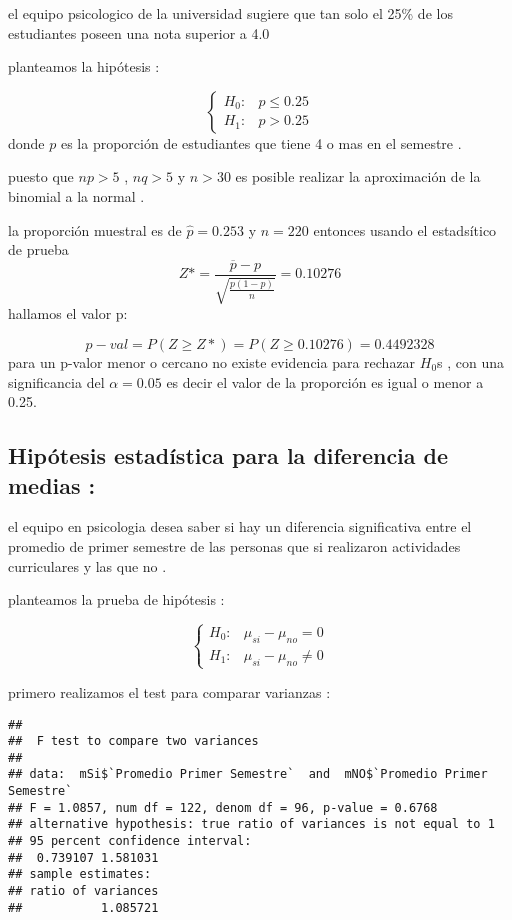 \documentclass[
  man]{apa6}
\begin{document}
el equipo psicologico de la universidad sugiere que tan solo el 25\% de
los estudiantes poseen una nota superior a 4.0

planteamos la hipótesis :

\[
\left\{
\begin{array}{ll}
H_{0}: &  p\leq 0.25\\
H_{1}: &  p> 0.25
\end{array}
\right.
\] donde \(p\) es la proporción de estudiantes que tiene 4 o mas en el
semestre .

puesto que \(np>5\) , \(nq>5\) y \(n>30\) es posible realizar la aproximación
de la binomial a la normal .

la proporción muestral es de \(\hat{p}=0.253\) y \(n=220\) entonces usando
el estadsítico de prueba\\
\[Z*= \frac{\overline{p} - p}{\sqrt{\frac{p(1-p)}{n}}}=0.10276\]
hallamos el valor p:

\[ p-val=P(Z\geq Z*)=P(Z\geq 0.10276)=0.4492328\] para un p-valor menor
o cercano no existe evidencia para rechazar \(H_0\)s , con una
significancia del \(\alpha=0.05\) es decir el valor de la proporción es
igual o menor a 0.25.

\clearpage

\hypertarget{hipuxf3tesis-estaduxedstica-para-la-diferencia-de-medias}{%
\subsection{Hipótesis estadística para la diferencia de medias :}\label{hipuxf3tesis-estaduxedstica-para-la-diferencia-de-medias}}

el equipo en psicologia desea saber si hay un diferencia significativa
entre el promedio de primer semestre de las personas que si realizaron
actividades curriculares y las que no .

planteamos la prueba de hipótesis :

\[
\left\{
\begin{array}{ll}
H_{0}: &  \mu_{si}-\mu_{no}= 0\\
H_{1}: &   \mu_{si}-\mu_{no}\neq 0
\end{array}
\right.
\]

primero realizamos el test para comparar varianzas :

\begin{verbatim}
## 
##  F test to compare two variances
## 
## data:  mSi$`Promedio Primer Semestre`  and  mNO$`Promedio Primer Semestre`
## F = 1.0857, num df = 122, denom df = 96, p-value = 0.6768
## alternative hypothesis: true ratio of variances is not equal to 1
## 95 percent confidence interval:
##  0.739107 1.581031
## sample estimates:
## ratio of variances 
##           1.085721
\end{verbatim}
\end{document}
